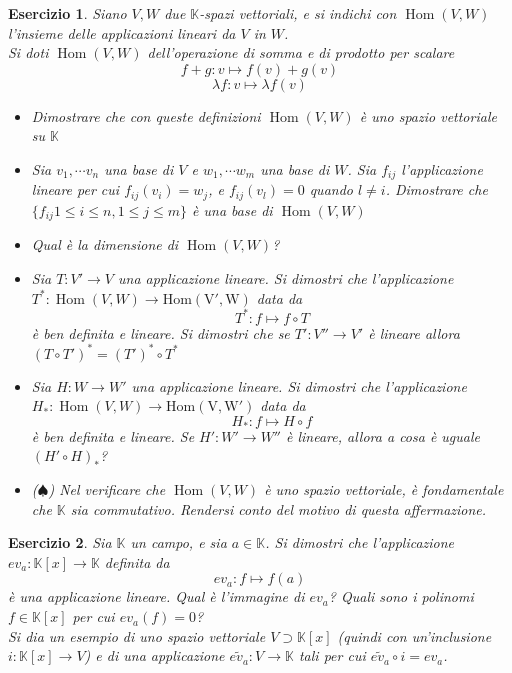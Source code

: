 \documentclass{article}
\newtheorem{es}{Esercizio}
\begin{document}
{\begin{es}
    Siano $V,W$ due $\mathbb{K}$-spazi vettoriali, e si indichi con $\operatorname{Hom}(V,W)$ l'insieme delle applicazioni lineari da $V$ in $W$.\\
    Si doti $\operatorname{Hom}(V,W)$ dell'operazione di somma e di prodotto per scalare
    $$f+g:v\mapsto f(v)+g(v)$$
    $$\lambda f:v\mapsto \lambda f(v)$$
    \begin{itemize}
        \item Dimostrare che con queste definizioni $\operatorname{Hom}(V,W)$ è uno spazio vettoriale su $\mathbb{K}$
        \item Sia $v_1,\cdots v_n$ una base di $V$ e $w_1,\cdots w_m$ una base di $W$. Sia $f_{ij}$ l'applicazione lineare per cui $f_{ij}(v_i)=w_j$, e $f_{ij}(v_l)=0$ quando $l\neq i$. Dimostrare che $\{f_{ij} 1\leq i\leq n, 1\leq j\leq m\}$ è una base di $\operatorname{Hom}(V,W)$
        \item Qual è la dimensione di $\operatorname{Hom}(V,W)$?
        \item Sia $T:V'\to V$ una applicazione lineare. Si dimostri che l'applicazione $T^\ast: \operatorname{Hom}(V,W)\to \operatorname{Hom(V',W)}$ data da
        $$T^\ast:f\mapsto f\circ T$$
        è ben definita e lineare. Si dimostri che se $T':V''\to V'$ è lineare allora $(T\circ T')^\ast =(T')^\ast\circ T^\ast$
        \item Sia $H:W\to W'$ una applicazione lineare. Si dimostri che l'applicazione $H_\ast: \operatorname{Hom}(V,W)\to \operatorname{Hom(V,W')}$ data da
        $$H_\ast:f\mapsto  H\circ f$$
        è ben definita e lineare. Se $H':W'\to W''$ è lineare, allora a cosa è uguale $(H'\circ H)_\ast$?
        \item ($\spadesuit$) Nel verificare che $\operatorname{Hom}(V,W)$ è uno spazio vettoriale, è fondamentale che $\mathbb{K}$ sia commutativo. Rendersi conto del motivo di questa affermazione.
        
        
    \end{itemize}
\end{es}


\begin{es}
    Sia $\mathbb{K}$ un campo, e sia $a\in \mathbb{K}$. Si dimostri che l'applicazione $ev_a:\mathbb{K}[x]\to \mathbb{K}$ definita da 
    $$ev_a:f\mapsto f(a)$$
    è una applicazione lineare. Qual è l'immagine di $ev_a$? Quali sono i polinomi $f\in \mathbb{K}[x]$ per cui $ev_a(f)=0$?\\
    Si dia un esempio di uno spazio vettoriale $V\supset \mathbb{K}[x]$ (quindi con un'inclusione $i:\mathbb{K}[x]\to V$) e di una applicazione $\tilde{ev_a}:V\to \mathbb{K}$ tali per cui $\tilde{ev_a}\circ i=ev_a$.
\end{es}



}
\end{document}
